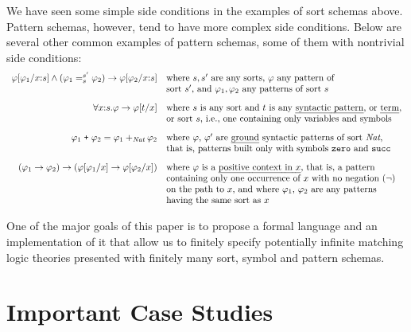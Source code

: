 \documentclass[UTF8,11pt]{article}
\theoremstyle{plain}
\theoremstyle{definition}
\theoremstyle{remark}
\newcommand{\cln}{{:}}
\newcommand{\Nat}{\textit{Nat}}
\begin{document}
We have seen some simple side conditions in the examples of sort schemas
above.
Pattern schemas, however, tend to have more complex side conditions.
Below are several other common examples of pattern schemas, some of them
with nontrivial side conditions:
$$
\begin{array}{rl}
\varphi[\varphi_1/{x\cln s}] \wedge (\varphi_1 =_s^{s'} \varphi_2) \rightarrow \varphi[\varphi_2/{x\cln s}]
&\textrm{where $s,s'$ are any sorts, $\varphi$ any pattern of} \\
& \textrm{sort $s'$, and $\varphi_1,\varphi_2$ any patterns of sort $s$}
\\[2ex]
\forall x\cln s . \varphi \rightarrow \varphi[t/x]
&\textrm{where $s$ is any sort and $t$ is any \emph{syntactic pattern}, or \emph{term}}, \\
& \textrm{or sort $s$, i.e., one containing only variables and symbols}
\\[2ex]
\varphi_1 \mathrel{\texttt{+}} \varphi_2 = \varphi_1 +_\Nat \varphi_2
& \textrm{where $\varphi$, $\varphi'$ are \emph{ground} syntactic patterns of sort $\Nat$,}
\\
&\textrm{that is, patterns built only with symbols \texttt{zero} and \texttt{succ}}
\\[2ex]
(\varphi_1 \rightarrow \varphi_2) \rightarrow
(\varphi[\varphi_1 / x] \rightarrow \varphi[\varphi_2 / x])
& \textrm{where $\varphi$ is a \emph{positive context in $x$}, that is, a pattern}
\\
& \textrm{containing only one occurrence of $x$ with no negation ($\neg$)}
\\
&\textrm{on the path to $x$, and where $\varphi_1$, $\varphi_2$ are any patterns}
\\
&\textrm{having the same sort as $x$}
\end{array}
$$

One of the major goals of this paper is to propose a formal language
and an implementation of it that allow us to finitely specify potentially
infinite matching logic theories presented with finitely many sort, symbol
and pattern schemas.

\section{Important Case Studies}
\end{document}
